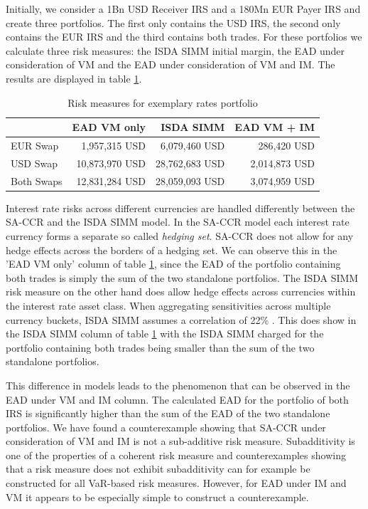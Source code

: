 \documentclass[../Thesis_AHoecherl.tex]{subfiles}
\begin{document}
    Initially, we consider a 1Bn USD Receiver \gls{IRS} and a 180Mn EUR Payer \gls{IRS} and create three portfolios. The first only contains the USD \gls{IRS}, the second only contains the EUR \gls{IRS} and the third contains both trades.
    For these portfolios we calculate three risk measures: the \gls{ISDA SIMM} initial margin, the \gls{EAD} under consideration of \gls{VM} and the \gls{EAD} under consideration of \gls{VM} and IM. The results are displayed in table \ref{tab:2TradeRatesResults}.

    \begin{table}[htbp]
        \centering
        \begin{tabular}{l||r|r|r}
                & \gls{EAD} \gls{VM} only &\gls{ISDA SIMM} & \gls{EAD} \gls{VM} + \gls{IM} \\
                \toprule
        EUR Swap & 1,957,315 USD & 6,079,460 USD & 286,420 USD \\
        USD Swap & 10,873,970 USD & 28,762,683 USD & 2,014,873 USD \\
        Both Swaps & 12,831,284 USD & 28,059,093 USD & 3,074,959 USD \\
        \end{tabular}%
        \caption{Risk measures for exemplary rates portfolio}
        \label{tab:2TradeRatesResults}%
    \end{table}%

    Interest rate risks across different currencies are handled differently between the \gls{SA-CCR} and the \gls{ISDA SIMM} model.
    In the \gls{SA-CCR} model each interest rate currency forms a separate so called \emph{hedging set}. \gls{SA-CCR} does not allow for any hedge effects across the borders of a hedging set.
    We can observe this in the 'EAD \gls{VM} only' column of table \ref{tab:2TradeRatesResults}, since the \gls{EAD} of the portfolio containing both trades is simply the sum of the two standalone portfolios.
    The \gls{ISDA SIMM} risk measure on the other hand does allow hedge effects across currencies within the interest rate asset class. When aggregating sensitivities across multiple currency buckets, \gls{ISDA SIMM} assumes a correlation of 22\% \cite[Section D.2]{SIMM}.
    This does show in the \gls{ISDA SIMM} column of table \ref{tab:2TradeRatesResults} with the \gls{ISDA SIMM} charged for the portfolio containing both trades being smaller than the sum of the two standalone portfolios.
    
    This difference in models leads to the phenomenon that can be observed in the \gls{EAD} under \gls{VM} and \gls{IM} column. The calculated \gls{EAD} for the portfolio of both \gls{IRS} is significantly higher than the sum of the \gls{EAD} of the two standalone portfolios.
    We have found a counterexample showing that \gls{SA-CCR} under consideration of \gls{VM} and \gls{IM} is not a sub-additive risk measure.
    Subadditivity is one of the properties of a coherent risk measure and counterexamples showing that a risk measure does not exhibit subadditivity can for example be constructed for all \gls{VaR}-based risk measures. However, for \gls{EAD} under \gls{IM} and \gls{VM} it appears to be especially simple to construct a counterexample.
\end{document}
